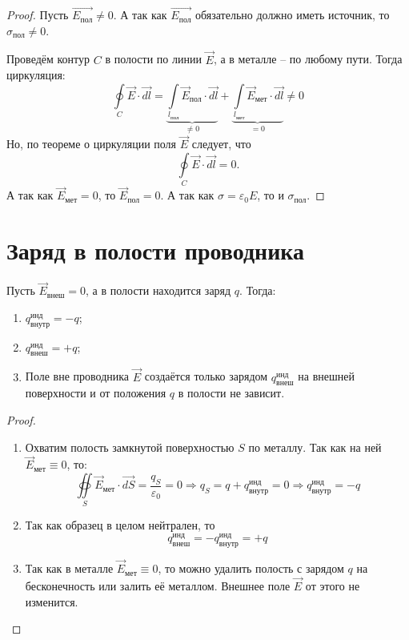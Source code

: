     \begin{proof}
        Пусть \( \vec{E_{\textit{пол}}} \ne 0 \). А так как
        \( \vec{E_{\textit{пол}}} \) обязательно должно иметь источник, то
        \( \sigma_{\textit{пол}} \ne 0 \). %

        Проведём контур \( C \) в полости по линии \( \vec{E} \),
        а в металле -- по любому пути. Тогда циркуляция:
        \[
            \oint\limits_C \vec{E}\cdot\vec{dl} = 
            \underbrace{\int\limits_{l_{\textit{пол}}} 
            \vec{E}_{\textit{пол}}\cdot\vec{dl}}_{\ne 0} + 
            \underbrace{\int\limits_{l_{\textit{мет}}} 
            \vec{E}_{\textit{мет}}\cdot\vec{dl}}_{= 0} \ne 0
        \]
        Но, по теореме о циркуляции поля \( \vec{E} \) следует, что
        \[
            \oint\limits_C \vec{E}\cdot\vec{dl} = 0.
        \]
        А так как \( \vec{E}_{\textit{мет}} = 0 \), то
        \( \vec{E}_{\textit{пол}} = 0 \). А так как
        \( \sigma = \varepsilon_0 E \), то и \( \sigma_{\textit{пол}} \).
    \end{proof}

 \section{Заряд в полости проводника}

    Пусть \( \vec{E}_{\textit{внеш}} = 0 \), а в полости находится заряд
    \( q \). Тогда:
    \begin{enumerate}
        \item \( q_{\textit{внутр}}^{\text{инд}} = -q \);
        \item \( q_{\textit{внеш}}^{\text{инд}} = +q \);
        \item Поле вне проводника \( \vec{E} \) создаётся только зарядом
            \( q_{\textit{внеш}}^{\text{инд}} \) на внешней поверхности и от 
            положения \( q \) в полости не зависит.
    \end{enumerate}

    \begin{proof}
    \begin{enumerate}
        \item Охватим полость замкнутой поверхностью \( S \) по металлу.
            Так как на ней \( \vec{E}_{\textit{мет}} \equiv 0 \), то:
            \[
                \oiint\limits_S \vec{E}_{\textit{мет}}\cdot\vec{dS} = 
                \frac{q_S}{\varepsilon_0} = 0 \Rightarrow q_S = q + 
                q_{\textit{внутр}}^{\text{инд}} = 0 \Rightarrow 
                q_{\textit{внутр}}^{\text{инд}} = -q
            \]
        \item Так как образец в целом нейтрален, то
            \[
                q_{\textit{внеш}}^{\text{инд}} =
                -q_{\textit{внутр}}^{\text{инд}} = +q
            \]
        \item Так как в металле \( \vec{E}_{\textit{мет}} \equiv 0 \), то  можно 
            удалить полость с зарядом \( q \) на бесконечность или залить её 
            металлом. Внешнее поле \( \vec{E} \) от этого не изменится.
    \end{enumerate}
    \end{proof}

